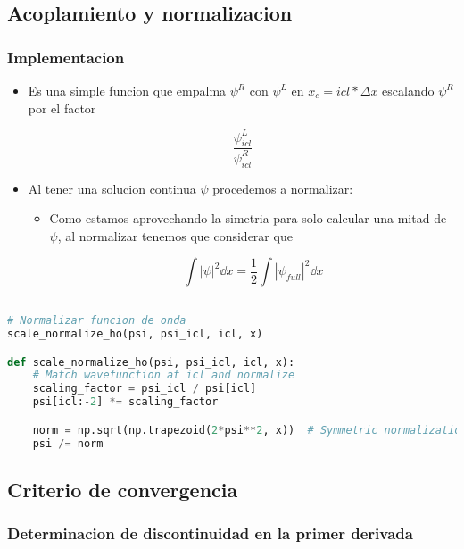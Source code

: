 \documentclass[11pt]{article}
\begin{document}
\subsection{Acoplamiento y normalizacion}
\label{sec:orgebecf68}

\subsubsection{Implementacion}
\label{sec:orgb8de890}

\begin{itemize}
\item Es una simple funcion que empalma \(\psi^R\) con \(\psi^L\) en \(x_c = icl*\Delta x\) escalando \(\psi^R\) por el factor

\[ \frac{\psi_{icl}^L}{\psi_{icl}^R} \]

\item Al tener una solucion continua \(\psi\) procedemos a normalizar:
\begin{itemize}
\item Como estamos aprovechando la simetria para solo calcular una mitad de \(\psi\), al normalizar tenemos que considerar que

\[ \int |\psi|^2 \dd{x} = \frac{1}{2} \int |\psi_{full}|^2 \dd{x} \]
\end{itemize}
\end{itemize}

\begin{lstlisting}[language=Python,numbers=none]

# Normalizar funcion de onda
scale_normalize_ho(psi, psi_icl, icl, x)

def scale_normalize_ho(psi, psi_icl, icl, x):
    # Match wavefunction at icl and normalize
    scaling_factor = psi_icl / psi[icl]
    psi[icl:-2] *= scaling_factor

    norm = np.sqrt(np.trapezoid(2*psi**2, x))  # Symmetric normalization
    psi /= norm

\end{lstlisting}
\subsection{Criterio de convergencia}
\label{sec:org2c822a5}

\subsubsection{Determinacion de discontinuidad en la primer derivada}
\label{sec:org2ba55d9}
\end{document}
